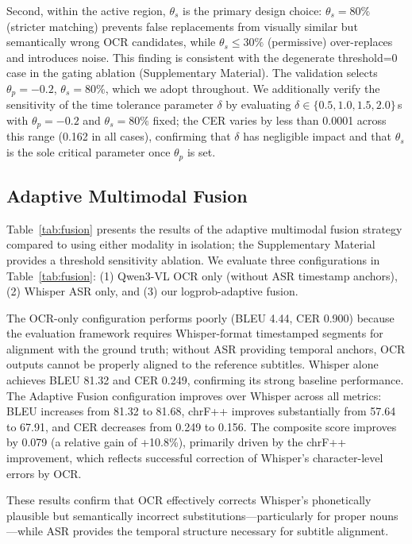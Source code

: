 \documentclass[journal]{IEEEtran}
\begin{document}
Second, within the active region, $\theta_s$ is the primary design choice: $\theta_s = 80\%$ (stricter matching) prevents false replacements from visually similar but semantically wrong OCR candidates, while $\theta_s \leq 30\%$ (permissive) over-replaces and introduces noise.
This finding is consistent with the degenerate threshold=0 case in the gating ablation (Supplementary Material).
The validation selects $\theta_p = -0.2$, $\theta_s = 80\%$, which we adopt throughout.
We additionally verify the sensitivity of the time tolerance parameter $\delta$ by evaluating $\delta \in \{0.5, 1.0, 1.5, 2.0\}$\,s with $\theta_p = -0.2$ and $\theta_s = 80\%$ fixed; the CER varies by less than 0.0001 across this range (0.162 in all cases), confirming that $\delta$ has negligible impact and that $\theta_s$ is the sole critical parameter once $\theta_p$ is set.

\subsection{Adaptive Multimodal Fusion}
\label{sec:fusion_results}

Table~\ref{tab:fusion} presents the results of the adaptive multimodal fusion strategy compared to using either modality in isolation; the Supplementary Material provides a threshold sensitivity ablation.
We evaluate three configurations in Table~\ref{tab:fusion}: (1) Qwen3-VL OCR only (without ASR timestamp anchors), (2) Whisper ASR only, and (3) our logprob-adaptive fusion.

The OCR-only configuration performs poorly (BLEU 4.44, CER 0.900) because the evaluation framework requires Whisper-format timestamped segments for alignment with the ground truth; without ASR providing temporal anchors, OCR outputs cannot be properly aligned to the reference subtitles.
Whisper alone achieves BLEU 81.32 and CER 0.249, confirming its strong baseline performance.
The Adaptive Fusion configuration improves over Whisper across all metrics: BLEU increases from 81.32 to 81.68, chrF++ improves substantially from 57.64 to 67.91, and CER decreases from 0.249 to 0.156.
The composite score improves by 0.079 (a relative gain of +10.8\%), primarily driven by the chrF++ improvement, which reflects successful correction of Whisper's character-level errors by OCR.

These results confirm that OCR effectively corrects Whisper's phonetically plausible but semantically incorrect substitutions---particularly for proper nouns---while ASR provides the temporal structure necessary for subtitle alignment.
\end{document}
